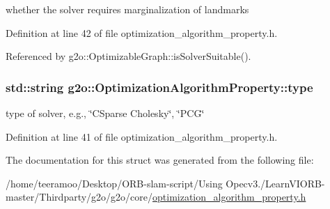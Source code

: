 whether the solver requires marginalization of landmarks 



Definition at line 42 of file optimization\+\_\+algorithm\+\_\+property.\+h.



Referenced by g2o\+::\+Optimizable\+Graph\+::is\+Solver\+Suitable().

\subsubsection[{\texorpdfstring{type}{type}}]{\setlength{\rightskip}{0pt plus 5cm}std\+::string g2o\+::\+Optimization\+Algorithm\+Property\+::type}\hypertarget{structg2o_1_1OptimizationAlgorithmProperty_a199f33f536f48f6ceda037f6a2ff206d}{}\label{structg2o_1_1OptimizationAlgorithmProperty_a199f33f536f48f6ceda037f6a2ff206d}


type of solver, e.\+g., \char`\"{}\+C\+Sparse Cholesky\char`\"{}, \char`\"{}\+P\+C\+G\char`\"{} 



Definition at line 41 of file optimization\+\_\+algorithm\+\_\+property.\+h.



The documentation for this struct was generated from the following file\+:\begin{DoxyCompactItemize}
\item 
/home/teeramoo/\+Desktop/\+O\+R\+B-\/slam-\/script/\+Using Opecv3./\+Learn\+V\+I\+O\+R\+B-\/master/\+Thirdparty/g2o/g2o/core/\hyperlink{optimization__algorithm__property_8h}{optimization\+\_\+algorithm\+\_\+property.\+h}\end{DoxyCompactItemize}
